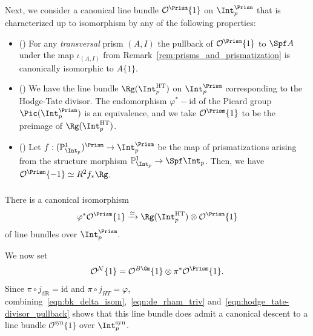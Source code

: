 \documentclass[10pt]{amsart}
\begin{document}
\subsubsection{}
Next, we consider a canonical line bundle $\mathcal{O}^{\Prism}\{1\}$ on $\Int_p^{\Prism}$ that is characterized up to isomorphism by any of the following properties:
\begin{itemize}
   \item (\cite[(2.2.11)]{bhatt2022absolute}) For any \emph{transversal} prism $(A,I)$ the pullback of $\mathcal{O}^{\Prism}\{1\}$ to $\Spf A$ under the map $\iota_{(A,I)}$ from Remark~\ref{rem:prisms_and_prismatization} is canonically isomorphic to $A\{1\}$.

   \item (\cite[\S 4.8,4.9]{drinfeld2022prismatization}) We have the line bundle $\Rg(\Int_p^{\mathrm{HT}})$ on $\Int_p^\Prism$ corresponding to the Hodge-Tate divisor. The endomorphism $\varphi^*-\mathrm{id}$ of the Picard group $\Pic(\Int_p^\Prism)$ is an equivalence, and we take $\mathcal{O}^{\Prism}\{1\}$ to be the preimage of $\Rg(\Int_p^{\mathrm{HT}})$.

   \item (\cite[(9.1.6)]{bhatt2022absolute}) Let $f:(\mathbb{P}^1_{\Int_p})^{\Prism}\to \Int_p^\Prism$ be the map of prismatizations arising from the structure morphism $\mathbb{P}^1_{\Int_p}\to \Spf \Int_p$. Then, we have $\mathcal{O}^{\Prism}\{-1\}\simeq R^2f_*\Rg$.
\end{itemize}

\subsubsection{}
There is a canonical isomorphism
\begin{align}\label{eqn:bk_delta_isom}
\varphi^*\mathcal{O}^{\Prism}\{1\}\xrightarrow{\simeq}\Rg(\Int_p^{\mathrm{HT}})\otimes\mathcal{O}^{\Prism}\{1\}
\end{align}
of line bundles over $\Int_p^\Prism$. 


We now set
\[
\mathcal{O}^{\mathcal{N}}\{1\} = \mathcal{O}^{B\Gm}\{1\}\otimes\pi^*\mathcal{O}^{\Prism}\{1\}.
\]
Since $\pi\circ j_{\mathrm{dR}} = \mathrm{id}$ and $\pi\circ j_{HT} = \varphi$, combining~\eqref{eqn:bk_delta_isom},~\eqref{eqn:de_rham_triv} and~\eqref{eqn:hodge_tate-divisor_pullback} shows that this line bundle does admit a canonical descent to a line bundle $\mathcal{O}^{\mathrm{syn}}\{1\}$ over $\Int_p^{\mathrm{syn}}$.
\end{document}
